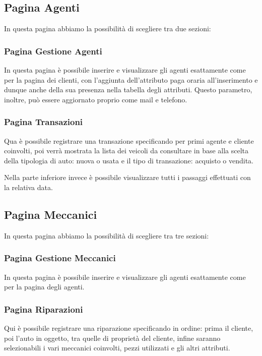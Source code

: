 \documentclass[a4paper,12pt]{report}
\begin{document}
\subsection*{Pagina Agenti}
In questa pagina abbiamo la possibilità di scegliere tra due sezioni:

\subsubsection*{Pagina Gestione Agenti}
In questa pagina è possibile inserire e visualizzare gli agenti esattamente come per la pagina dei clienti, con 
%
l'aggiunta dell'attributo paga oraria all'inserimento e dunque anche della sua presenza nella tabella degli attributi.
%
Questo parametro, inoltre, può essere aggiornato proprio come mail e telefono.

\subsubsection*{Pagina Transazioni}
Qua è possibile registrare una transazione specificando per primi agente e cliente coinvolti, poi verrà mostrata la lista
%
dei veicoli da consultare in base alla scelta della tipologia di auto: nuova o usata e il tipo di transazione: acquisto o vendita.

Nella parte inferiore invece è possibile visualizzare tutti i passaggi effettuati con la relativa data.

\subsection*{Pagina Meccanici}
In questa pagina abbiamo la possibilità di scegliere tra tre sezioni:

\subsubsection*{Pagina Gestione Meccanici}
In questa pagina è possibile inserire e visualizzare gli agenti esattamente come per la pagina degli agenti.

\subsubsection*{Pagina Riparazioni}
Qui è possibile registrare una riparazione specificando in ordine: prima il cliente, poi l'auto in oggetto, tra quelle 
%
di proprietà del cliente, infine saranno selezionabili i vari meccanici coinvolti, pezzi utilizzati e gli altri attributi.
\end{document}

